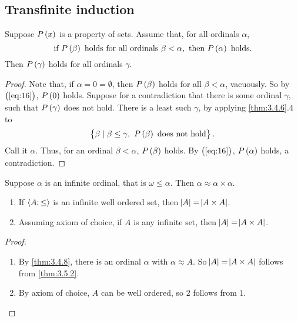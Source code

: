 \subsection{Transfinite induction}

\begin{theorem}
\label{thm:3.5.1}
Suppose $ P\br{x} $ is a property of sets. Assume that, for all ordinals $ \alpha $,
\begin{equation}
\label{eq:16}
\text{if} \ P\br{\beta} \ \text{holds for all ordinals} \ \beta < \alpha, \ \text{then} \ P\br{\alpha} \ \text{holds}.
\end{equation}
Then $ P\br{\gamma} $ holds for all ordinals $ \gamma $.
\end{theorem}

\begin{proof}
Note that, if $ \alpha = 0 = \emptyset $, then $ P\br{\beta} $ holds for all $ \beta < \alpha $, vacuously. So by $ \br{\ref{eq:16}} $, $ P\br{0} $ holds. Suppose for a contradiction that there is some ordinal $ \gamma $, such that $ P\br{\gamma} $ does not hold. There is a least such $ \gamma $, by applying \ref{thm:3.4.6}.$ 4 $ to
$$ \cbr{\beta \mid \beta \le \gamma, \ P\br{\beta} \ \text{does not hold}}. $$
Call it $ \alpha $. Thus, for an ordinal $ \beta < \alpha $, $ P\br{\beta} $ holds. By $ \br{\ref{eq:16}} $, $ P\br{\alpha} $ holds, a contradiction.
\end{proof}

\pagebreak

\begin{theorem}
\label{thm:3.5.2}
Suppose $ \alpha $ is an infinite ordinal, that is $ \omega \le \alpha $. Then $ \alpha \approx \alpha \times \alpha $.
\end{theorem}

\begin{corollary}
\label{cor:3.5.3}
\hfill
\begin{enumerate}
\item If $ \left\langle A; \le \right\rangle $ is an infinite well ordered set, then $ \abs{A} = \abs{A \times A} $.
\item Assuming axiom of choice, if $ A $ is any infinite set, then $ \abs{A} = \abs{A \times A} $.
\end{enumerate}
\end{corollary}

\begin{proof}
\hfill
\begin{enumerate}
\item By \ref{thm:3.4.8}, there is an ordinal $ \alpha $ with $ \alpha \approx A $. So $ \abs{A} = \abs{A \times A} $ follows from \ref{thm:3.5.2}.
\item By axiom of choice, $ A $ can be well ordered, so $ 2 $ follows from $ 1 $.
\end{enumerate}
\end{proof}

